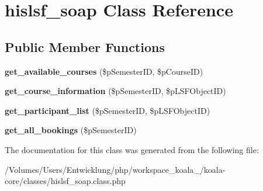 \hypertarget{classhislsf__soap}{
\section{hislsf\_\-soap Class Reference}
\label{classhislsf__soap}
}
\subsection*{Public Member Functions}
\begin{DoxyCompactItemize}
\item 
\hypertarget{classhislsf__soap_ad95380808de9d2c101e6dfb83abf38c3}{
{\bfseries get\_\-available\_\-courses} (\$pSemesterID, \$pCourseID)}
\label{classhislsf__soap_ad95380808de9d2c101e6dfb83abf38c3}

\item 
\hypertarget{classhislsf__soap_a677958415a91f4275b9c9fd93ceb76f4}{
{\bfseries get\_\-course\_\-information} (\$pSemesterID, \$pLSFObjectID)}
\label{classhislsf__soap_a677958415a91f4275b9c9fd93ceb76f4}

\item 
\hypertarget{classhislsf__soap_a06bc9da8d50ab30fb7884c2aa8cdbca3}{
{\bfseries get\_\-participant\_\-list} (\$pSemesterID, \$pLSFObjectID)}
\label{classhislsf__soap_a06bc9da8d50ab30fb7884c2aa8cdbca3}

\item 
\hypertarget{classhislsf__soap_a695a0ee3728305cc666e44db51729e8e}{
{\bfseries get\_\-all\_\-bookings} (\$pSemesterID)}
\label{classhislsf__soap_a695a0ee3728305cc666e44db51729e8e}

\end{DoxyCompactItemize}


The documentation for this class was generated from the following file:\begin{DoxyCompactItemize}
\item 
/Volumes/Users/Entwicklung/php/workspace\_\-koala\_/koala-\/core/classes/hislsf\_\-soap.class.php\end{DoxyCompactItemize}
